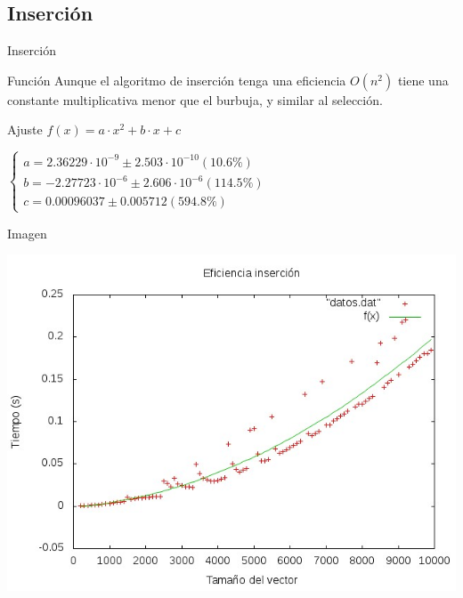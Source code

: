 \documentclass[compress]{beamer}
\begin{document}
\subsection{Inserción}
\begin{frame}{Inserción}
	\begin{block}{Función}
	Aunque el algoritmo de inserción tenga una eficiencia $O(n^2)$ tiene una constante 			multiplicativa menor que el burbuja, y similar al selección.
	\end{block}
	
	\begin{block}{Ajuste}
	$f(x) = a\cdot x^2 + b\cdot x + c$
	
	$\left\{ \begin{array}{c}
	a               = 2.36229\cdot 10^{-9}      \pm 2.503\cdot 10^{-10}    (10.6\%) \\
	b               = -2.27723\cdot 10^{-6}     \pm 2.606\cdot 10^{-6}    (114.5\%) \\
	c               = 0.00096037       \pm 0.005712     (594.8\%)
	\end{array}\right.$	
	\end{block}
\end{frame}

\begin{frame}
	\begin{alertblock}{Imagen}
	\begin{center}
	\includegraphics[scale=0.55]{../Graficas/Insercion/insercionO0_ruben.jpeg}
	\end{center}
	\end{alertblock}
\end{frame}
\end{document}
